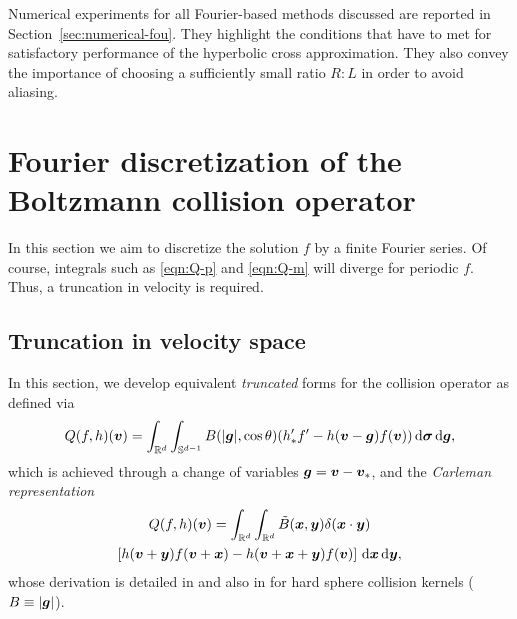 Numerical experiments for all Fourier-based methods discussed are reported in Section~\ref{sec:numerical-fou}.
They highlight the conditions that have to met for satisfactory performance of the hyperbolic cross
approximation.  They also convey the importance of choosing a sufficiently small ratio $R:L$ in order to avoid
aliasing.

\section[Fourier discretization of the Boltzmann collision operator]{Fourier discretization of the Boltzmann collision operator%
    }
\label{sec:fourier}

In this section we aim to discretize the solution $f$ by a finite Fourier
series. Of course, integrals such as \eqref{eqn:Q-p} and \eqref{eqn:Q-m} will
diverge for periodic $f$. Thus, a truncation in velocity is required.

\subsection{Truncation in velocity space} \label{sec:trunc}

In this section, we develop equivalent {\em truncated} forms for the collision
operator as defined via
\begin{equation} \label{eqn:Q-p}
    Q(f,h)({\bm v}) = \int_{\mathbb{R}^d}\int_{\mathbb{S}^{d-1}} B(|{\bm g}|,\cos\theta)(h_*'f' -
    h({\bm v}-{\bm g})f({\bm v}))\,\mathrm{d}{\bm\sigma} \,\mathrm{d} {\bm g},
\end{equation}
which is achieved through a change of variables ${\bm g}={\bm v}-{\bm v}_*$, and the {\em
Carleman representation}
\begin{multline} \label{eqn:Q-m}
    Q(f,h)({\bm v}) = \int_{\mathbb{R}^d}\int_{\mathbb{R}^d} \tilde{B}({\bm x},{\bm y}) \delta({\bm x}\cdot{\bm y}) \\
    \left[ h({\bm v}+{\bm y})f({\bm v}+{\bm x}) - h({\bm v}+{\bm x}+{\bm y})f({\bm v}) \right] \,\mathrm{d} {\bm x} \,\mathrm{d} {\bm y},
\end{multline}
whose derivation is detailed in \cite{Mouhot2006fac} and also in \cite{Bobylev1999fdm} for hard sphere collision
kernels ($B\equiv|{\bm g}|$).

